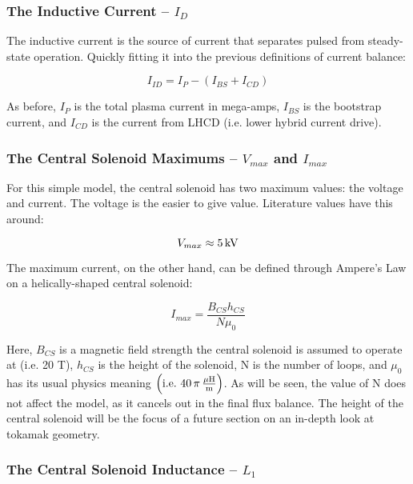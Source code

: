 \subsubsection{The Inductive Current -- $I_D$}

The inductive current is the source of current that separates pulsed from steady-state operation. Quickly fitting it into the previous definitions of current balance:

\begin{equation}
	I_{ID} = I_P - ( I_{BS} + I_{CD} )
\end{equation}

As before, $I_P$ is the total plasma current in mega-amps, $I_{BS}$ is the bootstrap current, and $I_{CD}$ is the current from LHCD (i.e. lower hybrid current drive).

\subsubsection{The Central Solenoid Maximums -- $V_{max}$ and $I_{max}$}

For this simple model, the central solenoid has two maximum values: the voltage and current. The voltage is the easier to give value. Literature values have this around:

\begin{equation}
	V_{max} \approx 5 \, \textnormal{kV}
\end{equation}

The maximum current, on the other hand, can be defined through Ampere's Law on a helically-shaped central solenoid:

\begin{equation}
	I_{max} = \frac{B_{CS} h_{CS}}{N \mu_0}
\end{equation}

Here, $B_{CS}$ is a magnetic field strength the central solenoid is assumed to operate at (i.e. 20 T), $h_{CS}$ is the height of the solenoid, N is the number of loops, and $\mu_0$ has its usual physics meaning $\left( \textnormal{i.e.} \ 40 \, \pi \, \frac{ \mu \textnormal{H}}{\textnormal{m}} \right)$. As will be seen, the value of N does not affect the model, as it cancels out in the final flux balance. The height of the central solenoid will be the focus of a future section on an in-depth look at tokamak geometry.

\subsubsection{The Central Solenoid Inductance -- $L_1$}

